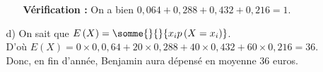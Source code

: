 \begin{itemize}
\begin{itemize}
\begin{itemize}
\textbf{Vérification :} On a bien $0,064 + 0,288 + 0,432 + 0,216 = 1$. \\

\end{itemize}

\item[d)] On sait que $E\left(X\right) = \somme{}{}{x_i p\left(X = x_i\right)}$. \\

D'où $E\left(X\right) = 0 \times 0,0,64 + 20 \times 0,288 + 40 \times 0,432 + 60 \times 0,216 = 36$. \\

Donc, en fin d'année, Benjamin aura dépensé en moyenne $36$ euros. 

\vspace*{-5cm}
\end{itemize}
\vspace*{-5cm}
\end{itemize}

\vspace*{-30cm}


\ifdefined\COMPLETE
\else
    
\fi